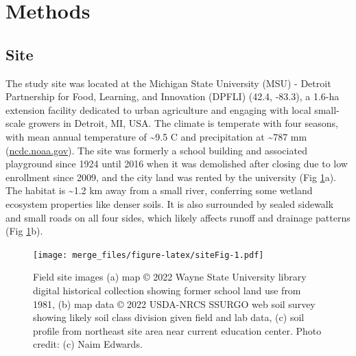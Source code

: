 \documentclass[
  12pt,
]{article}
\begin{document}
\hypertarget{methods}{%
\section{Methods}\label{methods}}

\hypertarget{site}{%
\subsection{Site}\label{site}}

The study site was located at the Michigan State University (MSU) - Detroit Partnership for Food, Learning, and Innovation (DPFLI) (42.4, -83.3), a 1.6-ha
extension facility dedicated to urban agriculture and engaging with local small-scale growers in Detroit, MI, USA.
The climate is temperate with four seasons, with mean annual temperature of \textasciitilde9.5 C
and precipitation at \textasciitilde787 mm
(\url{ncdc.noaa.gov}).
The site was formerly a school building and associated playground since 1924 until 2016 when it was demolished after closing due to low enrollment since 2009, and the city land was rented by the university (Fig \ref{fig:siteFig}a).
The habitat is \textasciitilde1.2 km
away from a small river, conferring some wetland ecosystem properties like denser soils.
It is also surrounded by sealed sidewalk and small roads on all four sides, which likely affects runoff and drainage patterns (Fig \ref{fig:siteFig}b).

\begin{figure}
\centering
\texttt{[image: merge\_files/figure-latex/siteFig-1.pdf]}
\caption{\label{fig:siteFig}Field site images (a) map © 2022 Wayne State University library digital historical collection showing former school land use from 1981, (b) map data © 2022 USDA-NRCS SSURGO web soil survey showing likely soil class division given field and lab data, (c) soil profile from northeast site area near current education center. Photo credit: (c) Naim Edwards.}
\end{figure}
\end{document}
